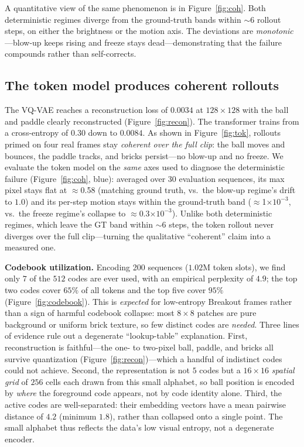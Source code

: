 \documentclass[10pt,twocolumn,letterpaper]{article}
\begin{document}
A quantitative view of the same phenomenon is in Figure~\ref{fig:coh}. Both
deterministic regimes diverge from the ground-truth bands within $\sim$6 rollout
steps, on either the brightness or the motion axis. The deviations are
\emph{monotonic}---blow-up keeps rising and freeze stays dead---demonstrating that
the failure compounds rather than self-corrects.

\subsection{The token model produces coherent rollouts}
\label{sec:tok}
The VQ-VAE reaches a reconstruction loss of $0.0034$ at $128\times128$ with the
ball and paddle clearly reconstructed (Figure~\ref{fig:recon}). The transformer
trains from a cross-entropy of $0.30$ down to $0.0084$. As shown in
Figure~\ref{fig:tok}, rollouts primed on four real frames stay \emph{coherent
over the full clip}: the ball moves and bounces, the paddle tracks, and bricks
persist---no blow-up and no freeze. We evaluate the token model on the
\emph{same} axes used to diagnose the deterministic failure
(Figure~\ref{fig:coh}, blue): averaged over 30 evaluation sequences, its max pixel
stays flat at $\approx$0.58 (matching ground truth, vs.\ the blow-up regime's
drift to $1.0$) and its per-step motion stays within the ground-truth band
($\approx$1$\times10^{-3}$, vs.\ the freeze regime's collapse to
$\approx$0.3$\times10^{-3}$). Unlike both deterministic regimes, which leave the
GT band within $\sim$6 steps, the token rollout never diverges over the full
clip---turning the qualitative ``coherent'' claim into a measured one.

\textbf{Codebook utilization.} Encoding 200 sequences ($1.02$M token slots), we
find only $7$ of the $512$ codes are ever used, with an empirical perplexity of
$4.9$; the top two codes cover $65\%$ of all tokens and the top five cover $95\%$
(Figure~\ref{fig:codebook}). This is \emph{expected} for low-entropy Breakout
frames rather than a sign of harmful codebook collapse: most $8\!\times\!8$
patches are pure background or uniform brick texture, so few distinct codes are
\emph{needed}. Three lines of evidence rule out a degenerate ``lookup-table''
explanation. First, reconstruction is faithful---the one- to two-pixel ball,
paddle, and bricks all survive quantization (Figure~\ref{fig:recon})---which a
handful of indistinct codes could not achieve. Second, the representation is not
$5$ codes but a $16\!\times\!16$ \emph{spatial grid} of $256$ cells each drawn
from this small alphabet, so ball position is encoded by \emph{where} the
foreground code appears, not by code identity alone. Third, the active codes are
well-separated: their embedding vectors have a mean pairwise distance of
$4.2$ (minimum $1.8$), rather than collapsed onto a
single point. The small alphabet thus reflects the data's low visual entropy, not
a degenerate encoder.
\end{document}
